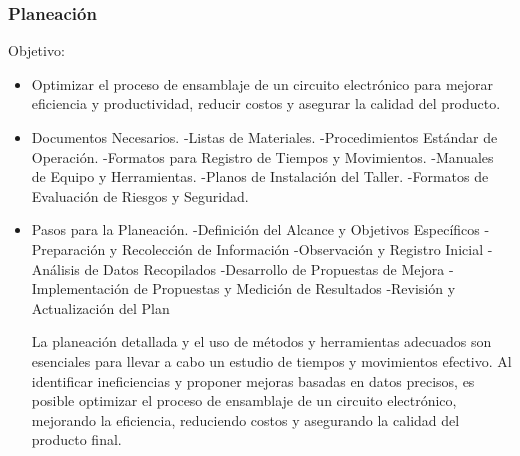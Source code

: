     \subsubsection{Planeación}
    Objetivo:
    \begin{itemize}
    \item Optimizar el proceso de ensamblaje de un circuito electrónico para mejorar eficiencia y productividad, reducir costos y asegurar la calidad del producto.
    \item Documentos Necesarios.
    -Listas de Materiales.
    -Procedimientos Estándar de Operación.
    -Formatos para Registro de Tiempos y Movimientos.
    -Manuales de Equipo y Herramientas.
    -Planos de Instalación del Taller.
    -Formatos de Evaluación de Riesgos y Seguridad.
    
    \item Pasos para la Planeación.
    -Definición del Alcance y Objetivos Específicos
    -Preparación y Recolección de Información
    -Observación y Registro Inicial
    -Análisis de Datos Recopilados
    -Desarrollo de Propuestas de Mejora
    -Implementación de Propuestas y Medición de Resultados
    -Revisión y Actualización del Plan
    
    La planeación detallada y el uso de métodos y herramientas adecuados son esenciales para llevar a cabo un estudio de tiempos y movimientos efectivo. Al identificar ineficiencias y proponer mejoras basadas en datos precisos, es posible optimizar el proceso de ensamblaje de un circuito electrónico, mejorando la eficiencia, reduciendo costos y asegurando la calidad del producto final.
    \end{itemize}
    
    
